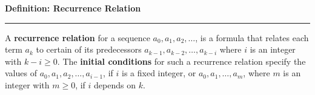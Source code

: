 \nopagenumbers
{\bf Definition: Recurrence Relation}
\vskip 1mm
\hrule

\vskip 6pt
A {\bf recurrence relation} for a sequence $a_0,a_1,a_2,\ldots$, is a formula that relates each term ${a_k}$ to certain of its predecessors $a_{k-1},a_{k-2},\ldots ,a_{k-i}$ where $i$ is an integer with $k-i\geq 0$. The {\bf initial conditions} for such a recurrence relation specify the values of $a_0, a_1, a_2, \ldots , a_{i-1}$, if $i$ is a fixed integer, or $a_0, a_1,\ldots , a_m$, where $m$ is an integer with $m\geq 0$, if $i$ depends on $k$.

\vfill\eject

